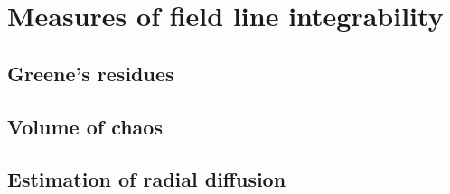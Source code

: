 \documentclass[my_thesis.tex]{subfiles}
\begin{document}
\chapter{Measures of field line integrability}

\section{Greene's residues}

\section{Volume of chaos}

\section{Estimation of radial diffusion}
\end{document}
